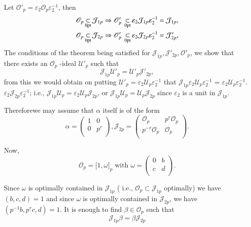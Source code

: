 Let $ \mathscr{O}'_p = \varepsilon_2 \mathscr{O}_p \varepsilon^{-1}_2 $, then
\begin{gather*}
  \mathscr{O}_p \subs_{\0pt}  \mathcal{J}_{1p} \Rightarrow
  \mathscr{O}'_p ~ \subs_{\0pt} \varepsilon_2 \mathcal{J}_{1p}
  \varepsilon^{-1}_2 = \mathcal{J}_{1p}, \\ 
  \mathscr{O}_p \subs_{\0pt}  \mathcal{J}_{2p} \Rightarrow
  \mathscr{O}'_p ~ \subs_{\0pt} \varepsilon_2 \mathcal{J}_{2p}
  \varepsilon^{-1}_2 = \mathcal{J}'_{2p},
\end{gather*}
The conditions of the theorem being satisfied for $
\mathcal{J}_{1p}, \mathcal{J}'_{2p}, \mathscr{O}'_p $, we show that
there exists an $ \mathscr{O}_p $ -ideal $ \mathscr{U}'_p $ such that  
$$
\mathcal{J}_{1p} \mathscr{U}'_p = \mathscr{U}'_p  \mathcal{J}'_{2p},
$$
from this we would obtain on putting  $ \mathscr{U}'_p = \varepsilon_2
\mathscr{U}_p \varepsilon^{-1}_2 $ that $ \mathcal{J}_{1p}
\varepsilon_2 \mathscr{U}_p \varepsilon^{-1}_2$  = $\varepsilon_2
\mathscr{U}_p \varepsilon^{-1}_2 $. $ \varepsilon_2 \mathcal{J}_{2p}
\varepsilon_{2}^{-1} $;  i.e.,  $ \mathcal{J}_{1p} \mathscr{U}_p =
\varepsilon_2 \mathscr{U}_p \mathcal{J}_{2p} $, or  $ \mathcal{J}_{1p}
\mathscr{U}_p = \mathscr{U}_p \mathcal{J}_{2p} $ since $ \varepsilon_2
$ is a unit in $ \mathcal{J}_{1p} $. 

Therefore\pageoriginale we may assume that $ \alpha $ itself is of the form
$$
 \alpha =\begin{pmatrix} 1 & 0 \\ 0 & p^r \\ \end{pmatrix},
 \mathcal{J}_{2p} = \begin{pmatrix} \mathscr{O}_p & p^r \mathscr{O}_p
   \\ p^{-r} \mathscr{O}_p & \mathscr{O}_p \\ \end{pmatrix}.  
$$

Now, 
$$
\mathscr{O}_p = \big[ 1, \omega \big ]_p \text{ with }  \omega
= \begin{pmatrix} 0 & b \\ c & d \\ \end{pmatrix}.  
$$

Since $ \omega $ is optimally contained in $ \mathcal{J}_{1p}$ (
i.e., $\mathscr{O}_p \subset \mathcal{J}_{1p} $ optimally) we have
$(b, c, d) = 1$ and since $ \omega $ is optimally contained in $
\mathcal{J}_{2p} $, we have $ ( p^{-1}b, p^rc, d ) =1 $. It is enough
to find $ \beta \in \mathscr{O}_p $ such that  
\begin{equation}
  \mathcal{J}_{1p} \beta = \beta \mathcal{J}_{2p} \tag{1}
\end{equation}

